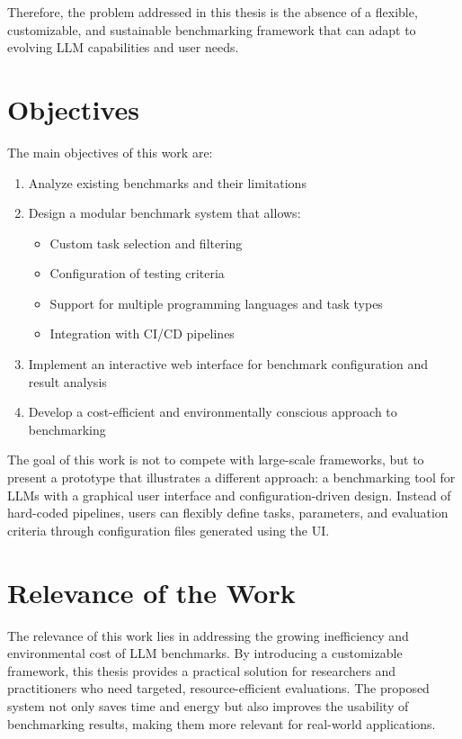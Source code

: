 Therefore, the problem addressed in this thesis is the absence of a flexible, customizable, and sustainable benchmarking framework that can adapt to evolving LLM capabilities and user needs.

\section{Objectives}

The main objectives of this work are:
\begin{enumerate}
    \item Analyze existing benchmarks and their limitations
    \item Design a modular benchmark system that allows:
    \begin{itemize}
        \item Custom task selection and filtering
        \item Configuration of testing criteria
        \item Support for multiple programming languages and task types
        \item Integration with CI/CD pipelines
    \end{itemize}
    \item Implement an interactive web interface for benchmark configuration and result analysis
    \item Develop a cost-efficient and environmentally conscious approach to benchmarking
\end{enumerate}

The goal of this work is not to compete with large-scale frameworks, but to present a prototype that illustrates a different approach: a benchmarking tool for LLMs with a graphical user interface and configuration-driven design.
Instead of hard-coded pipelines, users can flexibly define tasks, parameters, and evaluation criteria through configuration files generated using the UI.

\section{Relevance of the Work}

The relevance of this work lies in addressing the growing inefficiency and environmental cost of LLM benchmarks.
By introducing a customizable framework, this thesis provides a practical solution for researchers and practitioners who need targeted, resource-efficient evaluations.
The proposed system not only saves time and energy but also improves the usability of benchmarking results, making them more relevant for real-world applications.



